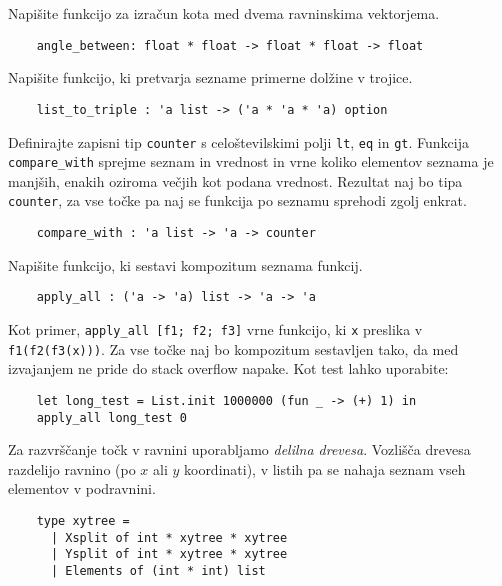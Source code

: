 \documentclass[arhiv]{../izpit}
\begin{document}
	
	

	\naloga 
  
	\podnaloga Napišite funkcijo za izračun kota med dvema ravninskima vektorjema.
  \begin{verbatim}
    angle_between: float * float -> float * float -> float
  \end{verbatim}

  \podnaloga Napišite funkcijo, ki pretvarja sezname primerne dolžine v trojice. 
  \begin{verbatim}
    list_to_triple : 'a list -> ('a * 'a * 'a) option
  \end{verbatim}

  \podnaloga Definirajte zapisni tip \verb|counter| s celoštevilskimi polji \verb|lt|, \verb|eq| in \verb|gt|. Funkcija \verb|compare_with| sprejme seznam in vrednost in vrne koliko elementov seznama je manjših, enakih oziroma večjih kot podana vrednost. Rezultat naj bo tipa \verb|counter|, za vse točke pa naj se funkcija po seznamu sprehodi zgolj enkrat.
  \begin{verbatim}
    compare_with : 'a list -> 'a -> counter
	\end{verbatim}
	
  \podnaloga Napišite funkcijo, ki sestavi kompozitum seznama funkcij. 
  \begin{verbatim}
    apply_all : ('a -> 'a) list -> 'a -> 'a
	\end{verbatim}
  Kot primer, \verb|apply_all [f1; f2; f3]| vrne funkcijo, ki \verb|x| preslika v \verb|f1(f2(f3(x)))|. Za vse točke naj bo kompozitum sestavljen tako, da med izvajanjem ne pride do stack overflow napake. Kot test lahko uporabite:
  \begin{verbatim}
    let long_test = List.init 1000000 (fun _ -> (+) 1) in
    apply_all long_test 0
  \end{verbatim}

  \naloga
  
  Za razvrščanje točk v ravnini uporabljamo \emph{delilna drevesa}. Vozlišča drevesa razdelijo ravnino (po $x$ ali $y$ koordinati), v listih pa se nahaja seznam vseh elementov v podravnini.
  	\begin{verbatim}
    type xytree = 
      | Xsplit of int * xytree * xytree
      | Ysplit of int * xytree * xytree
      | Elements of (int * int) list
  	\end{verbatim}
  
\end{document}
